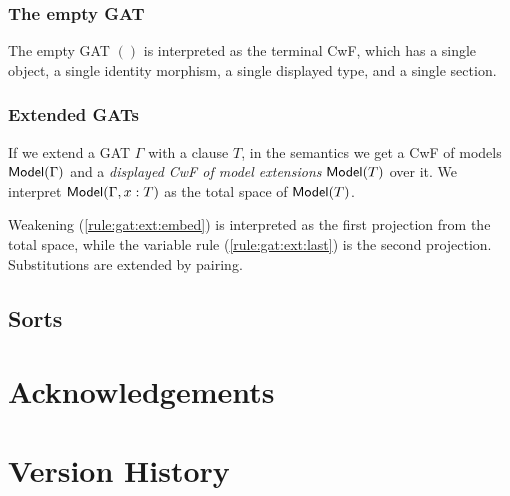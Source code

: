 \documentclass[a4paper]{article}
\begin{document}
\subsubsection{The empty GAT}
The empty GAT $()$ is interpreted as the terminal CwF, which has a single object, a single identity morphism, a single displayed type, and a single section.

\subsubsection{Extended GATs}
If we extend a GAT $\Gamma$ with a clause $T$, in the semantics we get a CwF of models ${\mathsf{Model}}(\Gamma)$ and a \emph{displayed CwF of model extensions} ${\mathsf{Model}}(T)$ over it. We interpret ${\mathsf{Model}}(\Gamma, x : T)$ as the total space of ${\mathsf{Model}}(T)$.

Weakening (\ref{rule:gat:ext:embed}) is interpreted as the first projection from the total space, while the variable rule (\ref{rule:gat:ext:last}) is the second projection. Substitutions are extended by pairing.

\subsection{Sorts}

\section*{Acknowledgements}

\appendix
\section{Version History}



\end{document}
